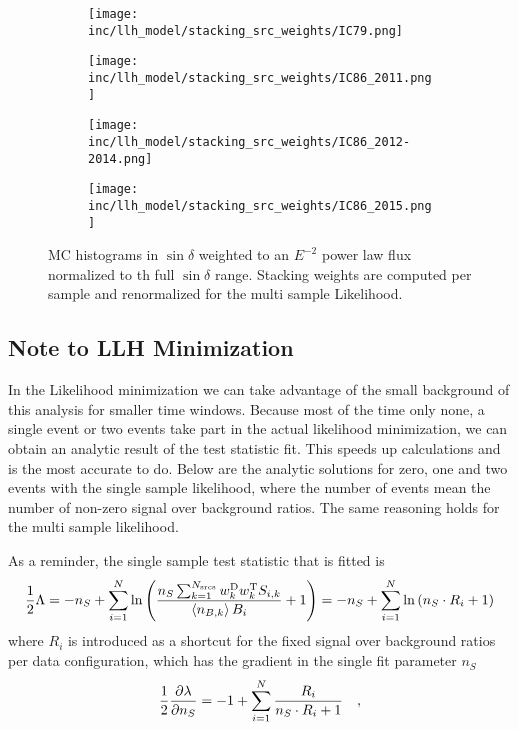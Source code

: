 \begin{figure}[h]
  \centering
  \begin{subfigure}[c]{0.49\textwidth}
    \texttt{[image: inc/llh\_model/stacking\_src\_weights/IC79.png]}
  \end{subfigure}
  \hfill
  \begin{subfigure}[c]{0.49\textwidth}
    \texttt{[image: inc/llh\_model/stacking\_src\_weights/IC86\_2011.png]}
  \end{subfigure}

  \begin{subfigure}[c]{0.49\textwidth}
    \texttt{[image: inc/llh\_model/stacking\_src\_weights/IC86\_2012-2014.png]}
  \end{subfigure}
  \hfill
  \begin{subfigure}[c]{0.49\textwidth}
    \texttt{[image: inc/llh\_model/stacking\_src\_weights/IC86\_2015.png]}
  \end{subfigure}

  \caption{MC histograms in $\sin\delta$ weighted to an $E^{-2}$ power law flux normalized to th full $\sin\delta$ range. Stacking weights are computed per sample and renormalized for the multi sample Likelihood.}
  \label{fig:stacking_src_weights_spl}
\end{figure}

\subsection{Note to LLH Minimization}
In the Likelihood minimization we can take advantage of the small background of this analysis for smaller time windows.
Because most of the time only none, a single event or two events take part in the actual likelihood minimization, we can obtain an analytic result of the test statistic fit.
This speeds up calculations and is the most accurate to do.
Below are the analytic solutions for zero, one and two events with the single sample likelihood, where the number of events mean the number of non-zero signal over background ratios.
The same reasoning holds for the multi sample likelihood.

As a reminder, the single sample test statistic that is fitted is
\begin{equation}
  \frac{1}{2}\Lambda
  = -n_S + \sum_{i=1}^N \ln\left(
      \frac{n_S\sum_{k=1}^{N_\text{srcs}}
            w_k^\text{D}w_k^\text{T}S_{i,k}}
           {\Braket{n_{B,k}} B_i} + 1\right)
  = -n_S + \sum_{i=1}^N \ln\left(n_S \cdot R_i + 1\right)
\end{equation}
where $R_i$ is introduced as a shortcut for the fixed signal over background ratios per data configuration, which has the gradient in the single fit parameter $n_S$
\begin{equation}
  \frac{1}{2}\frac{\partial \lambda}{\partial n_S}
  = -1 + \sum_{i=1}^N \frac{R_i}{n_S\cdot R_i + 1} \quad\text{,}
\end{equation}

